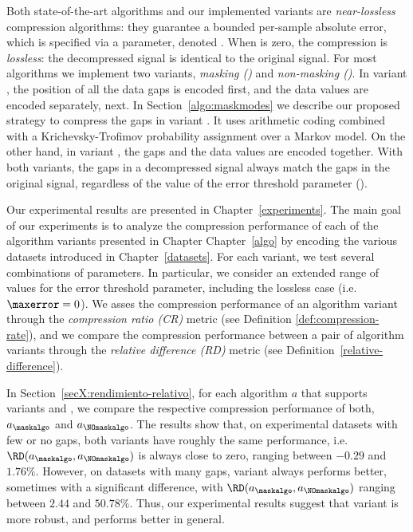 Both state-of-the-art algorithms and our implemented variants are \textit{near-lossless} compression algorithms: they guarantee a bounded per-sample absolute error, which is specified via a parameter, denoted \maxerror. When \maxerror is zero, the compression is \textit{lossless}: the decompressed signal is identical to the original signal. For most algorithms we implement two variants, \textit{masking (\maskalgo)} and \textit{non-masking (\NOmaskalgo)}. In variant \maskalgo, the position of all the data gaps is encoded first, and the data values are encoded separately, next. In Section~\ref{algo:maskmodes} we describe our proposed strategy to compress the gaps in variant \maskalgo. It uses arithmetic coding \cite{ac2, Cover2005} combined with a Krichevsky-Trofimov probability assignment \cite{ktestimator} over a Markov model. On the other hand, in variant \NOmaskalgo, the gaps and the data values are encoded together. With both variants, the gaps in a decompressed signal always match the gaps in the original signal, regardless of the value of the error threshold parameter (\maxerror).


Our experimental results are presented in Chapter~\ref{experiments}. The main goal of our experiments is to analyze the compression performance of each of the algorithm variants presented in Chapter Chapter~\ref{algo} by encoding the various datasets introduced in Chapter~\ref{datasets}. For each variant, we test several combinations of parameters. In particular, we consider an extended range of values for the error threshold parameter, including the lossless case (i.e. $\maxerror=0$). We asses the compression performance of an algorithm variant through the \textit{compression ratio (CR)} metric (see Definition \ref{def:compression-rate}), and we compare the compression performance between a pair of algorithm variants through the \textit{relative difference (RD)} metric (see Definition~\ref{relative-difference}). 


In Section~\ref{secX:rendimiento-relativo}, for each algorithm $a$ that supports variants \maskalgo and \NOmaskalgo, we compare the respective compression performance of both, $a_\maskalgo$ and $a_\NOmaskalgo$. The results show that, on experimental datasets with few or no gaps, both variants have roughly the same performance, i.e. $\RD(a_\maskalgo, a_\NOmaskalgo)$ is always close to zero, ranging between $-0.29$ and $1.76\%$. However, on datasets with many gaps, variant \maskalgo always performs better, sometimes with a significant difference, with $\RD(a_\maskalgo, a_\NOmaskalgo)$ ranging between $2.44$ and $50.78\%$. Thus, our experimental results suggest that variant \maskalgo is more robust, and performs better in general.


